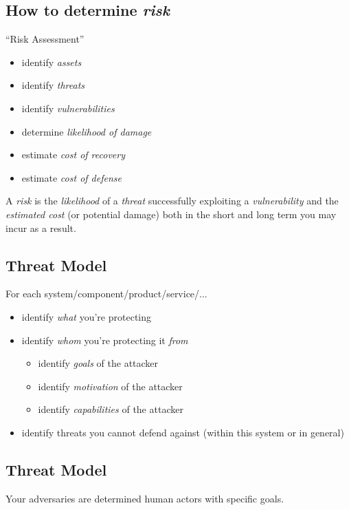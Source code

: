 \documentclass[xga]{xdvislides}
\begin{document}
\subsection{How to determine {\em risk}}
``Risk Assessment''
\begin{itemize}
	\item identify {\em assets}
	\item identify {\em threats}
	\item identify {\em vulnerabilities}
	\item determine {\em likelihood of damage}
	\item estimate {\em cost of recovery}
	\item estimate {\em cost of defense}
\end{itemize}
\vspace{.5in}

A {\em risk} is the {\em likelihood} of a {\em threat} successfully exploiting
a {\em vulnerability} and the {\em estimated cost} (or potential damage) both
in the short and long term you may incur as a result.

\subsection{Threat Model}
For each system/component/product/service/...

\begin{itemize}
	\item identify {\em what} you're protecting
	\item identify {\em whom} you're protecting it {\em from}
		\begin{itemize}
			\item identify {\em goals} of the attacker
			\item identify {\em motivation} of the attacker
			\item identify {\em capabilities} of the attacker
		\end{itemize}
	\item identify threats you cannot defend against (within this
		system or in general)
\end{itemize}

\subsection{Threat Model}
\vspace*{\fill}
\Huge
\begin{center}
Your adversaries are determined human actors with
specific goals.
\end{center}
\Normalsize
\vspace*{\fill}
\end{document}
